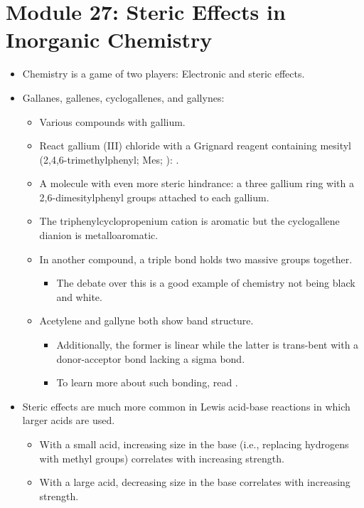 \documentclass[../notes.tex]{subfiles}
\begin{document}
\section{Module 27: Steric Effects in Inorganic Chemistry}
\begin{itemize}
    \item {}Chemistry is a game of two players: Electronic and steric effects.
    \item Gallanes, gallenes, cyclogallenes, and gallynes:
    \begin{itemize}
        \item Various compounds with gallium.
        \item React gallium (III) chloride with a Grignard reagent containing mesityl (2,4,6-trimethylphenyl; Mes; ): .
        \item A molecule with even more steric hindrance: a three gallium ring with a 2,6-dimesitylphenyl groups attached to each gallium.
        \item The triphenylcyclopropenium cation is aromatic but the cyclogallene dianion is metalloaromatic.
        \item In another compound, a  triple bond holds two massive groups together.
        \begin{itemize}
            \item The debate over this is a good example of chemistry not being black and white.
        \end{itemize}
        \item Acetylene and gallyne both show band structure.
        \begin{itemize}
            \item Additionally, the former is linear while the latter is trans-bent with a donor-acceptor bond lacking a sigma bond.
            \item To learn more about such bonding, read \textcite{bib:PowerTransBent}.
        \end{itemize}
    \end{itemize}
    \item Steric effects are much more common in Lewis acid-base reactions in which larger acids are used.
    \begin{itemize}
        \item With a small acid, increasing size in the base (i.e., replacing hydrogens with methyl groups) correlates with increasing strength.
        \item With a large acid, decreasing size in the base correlates with increasing strength.

\end{itemize}
\end{itemize}
\end{document}

